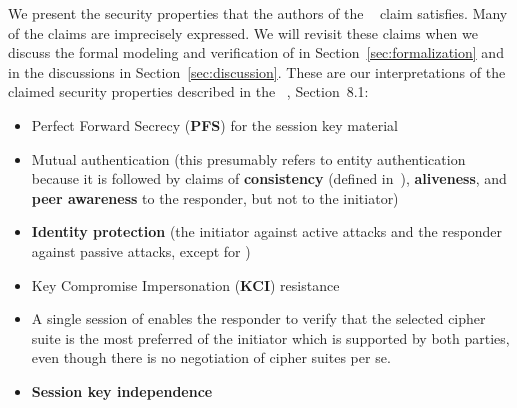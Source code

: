 We present the security properties that the authors
of the \mSpec{}~\cite{selander-lake-edhoc-01} claim \mEdhoc{} satisfies.
%
Many of the claims are imprecisely expressed.
%
We will revisit these claims when we discuss the formal modeling and
verification of \mEdhoc{} in Section~\ref{sec:formalization} and in the
discussions in Section~\ref{sec:discussion}.
%
These are our interpretations of the claimed security properties described in
the \mSpec~\cite{selander-lake-edhoc-01}, Section~8.1:
\begin{itemize}
    \item Perfect Forward Secrecy (\textbf{PFS}) for the session key material
    \item Mutual authentication (this presumably refers to entity authentication
        because it is followed by claims of
        \textbf{consistency} (defined in~\cite{sigma}),
        \textbf{aliveness}, and
        \textbf{peer awareness} to the responder, but not to the initiator)
    \item \textbf{Identity protection} (the initiator against active attacks
        and the responder against passive attacks, except for \mPskPsk{})
    \item Key Compromise Impersonation (\textbf{KCI}) resistance
    \item A single session of \mEdhoc{} enables the responder to verify
            that the selected cipher suite is the most preferred of the
            initiator which is supported by both parties, even though there is
            no negotiation of cipher suites per se.
    \item \textbf{Session key independence}
\end{itemize}

